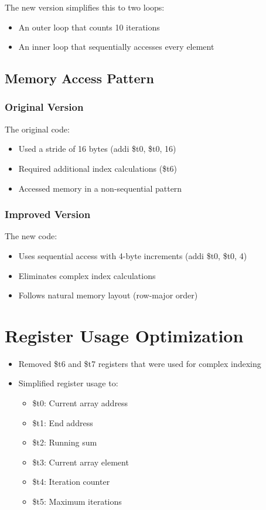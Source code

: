 \documentclass{article}
\begin{document}
The new version simplifies this to two loops:
\begin{itemize}
    \item An outer loop that counts 10 iterations
    \item An inner loop that sequentially accesses every element
\end{itemize}

\subsection{Memory Access Pattern}
\subsubsection{Original Version}
The original code:
\begin{itemize}
    \item Used a stride of 16 bytes (addi \$t0, \$t0, 16)
    \item Required additional index calculations (\$t6)
    \item Accessed memory in a non-sequential pattern
\end{itemize}

\subsubsection{Improved Version}
The new code:
\begin{itemize}
    \item Uses sequential access with 4-byte increments (addi \$t0, \$t0, 4)
    \item Eliminates complex index calculations
    \item Follows natural memory layout (row-major order)
\end{itemize}

\section{Register Usage Optimization}
\begin{itemize}
    \item Removed \$t6 and \$t7 registers that were used for complex indexing
    \item Simplified register usage to:
    \begin{itemize}
        \item \$t0: Current array address
        \item \$t1: End address
        \item \$t2: Running sum
        \item \$t3: Current array element
        \item \$t4: Iteration counter
        \item \$t5: Maximum iterations
    \end{itemize}
\end{itemize}
\end{document}
